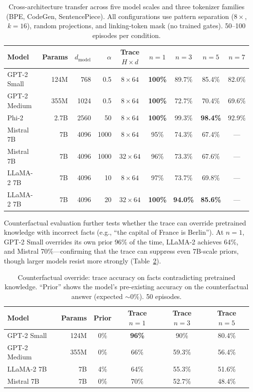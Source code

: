 \documentclass[11pt,a4paper]{article}
\begin{document}
\begin{table}[t]
  \centering
  \caption{Cross-architecture transfer across five model scales and three tokenizer families (BPE, CodeGen, SentencePiece). All configurations use pattern separation ($8\times$, $k{=}16$), random projections, and linking-token mask (no trained gates). 50--100 episodes per condition.}
  \label{tab:scaling}
  \begin{tabular}{@{}lrrrccccc@{}}
    \toprule
    Model & Params & $d_{\text{model}}$ & $\alpha$ & Trace $H \times d$ & $n{=}1$ & $n{=}3$ & $n{=}5$ & $n{=}7$ \\
    \midrule
    GPT-2 Small & 124M & 768 & 0.5 & $8 \times 64$ & \textbf{100\%} & 89.7\% & 85.4\% & 82.0\% \\
    GPT-2 Medium & 355M & 1024 & 0.5 & $8 \times 64$ & \textbf{100\%} & 72.7\% & 70.4\% & 69.6\% \\
    Phi-2 & 2.7B & 2560 & 50 & $8 \times 64$ & \textbf{100\%} & 99.3\% & \textbf{98.4\%} & 92.9\% \\
    \addlinespace
    Mistral 7B & 7B & 4096 & 1000 & $8 \times 64$ & 95\% & 74.3\% & 67.4\% & --- \\
    Mistral 7B & 7B & 4096 & 1000 & $32 \times 64$ & 96\% & 73.3\% & 67.6\% & --- \\
    \addlinespace
    LLaMA-2 7B & 7B & 4096 & 10 & $8 \times 64$ & 97\% & 73.7\% & 69.8\% & --- \\
    LLaMA-2 7B & 7B & 4096 & 20 & $32 \times 64$ & \textbf{100\%} & \textbf{94.0\%} & \textbf{85.6\%} & --- \\
    \bottomrule
  \end{tabular}
\end{table}

Counterfactual evaluation further tests whether the trace can override pretrained knowledge with incorrect facts (e.g., ``the capital of France is Berlin''). At $n{=}1$, GPT-2 Small overrides its own prior 96\% of the time, LLaMA-2 achieves 64\%, and Mistral 70\%---confirming that the trace can suppress even 7B-scale priors, though larger models resist more strongly (Table~\ref{tab:counterfactual}).

\begin{table}[t]
  \centering
  \caption{Counterfactual override: trace accuracy on facts contradicting pretrained knowledge. ``Prior'' shows the model's pre-existing accuracy on the counterfactual answer (expected ${\sim}0\%$). 50 episodes.}
  \label{tab:counterfactual}
  \begin{tabular}{@{}lrcccc@{}}
    \toprule
    Model & Params & Prior & Trace $n{=}1$ & Trace $n{=}3$ & Trace $n{=}5$ \\
    \midrule
    GPT-2 Small & 124M & 0\% & \textbf{96\%} & 90\% & 80.4\% \\
    GPT-2 Medium & 355M & 0\% & 66\% & 59.3\% & 56.4\% \\
    LLaMA-2 7B & 7B & 4\% & 64\% & 55.3\% & 51.6\% \\
    Mistral 7B & 7B & 0\% & 70\% & 52.7\% & 48.4\% \\
    \bottomrule
  \end{tabular}
\end{table}
\end{document}
